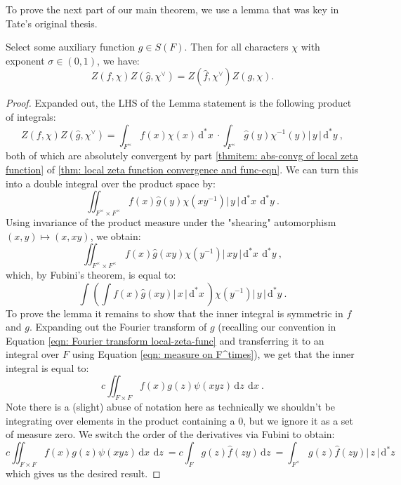 \documentclass[11pt, x11names]{article}
\renewcommand{\brack}[1]{\left(   #1 \right)}
\newcommand{\abs}[1]{\left| \, #1  \,\right|}
\renewcommand{\hat}{\widehat}
\newcommand{\inv}[1]{#1^{-1}}
\newcommand{\dx}{\, \mathrm{d}x \ }
\newcommand{\dz}{\, \mathrm{d}z \ }
\renewcommand{\d}[1]{\, \mathrm{d}#1 \ }
\begin{document}
To prove the next part of our main theorem, we use a lemma that was key in Tate's original thesis. 
\begin{lemma}
\label{lemma: local-zeta-func func eqn}
    Select some auxiliary function $g \in S(F)$. Then for all characters $\chi$ with exponent $\sigma \in (0, 1)$, we have:
    \begin{equation*}
        Z(f, \chi) Z(\hat{g}, \chi^\lor) = Z(\hat{f}, \chi^\lor)Z(g, \chi).
    \end{equation*}
\end{lemma}
\begin{proof}
Expanded out, the LHS of the Lemma statement is the following product of integrals:
\begin{equation*}
    Z(f, \chi) Z(\hat{g}, \chi^\lor) = \int_{F^\times} f(x) \chi(x) \d{^*x} \cdot \int_{F^\times} \hat{g}(y) \inv{\chi}(y) \abs{y} \d{^*y},
\end{equation*}
both of which are absolutely convergent by part \ref{thmitem: abs-convg of local zeta function} of \ref{thm: local zeta function convergence and func-eqn}. We can turn this into a double integral over the product space by:
\begin{equation*}
    \iint_{F^\times \times F^\times} f(x)\hat{g}(y) \chi(x \inv{y}) \abs{y} \d{^*x} \d{^*y}.
\end{equation*}
Using invariance of the product measure under the "shearing" automorphism $(x, y) \mapsto (x, xy)$, we obtain:
\begin{equation*}
    \iint_{F^\times \times F^\times} f(x)\hat{g}(xy)\chi(\inv{y}) \abs{xy} \d{^*x} \d{^*y},
\end{equation*}
which, by Fubini's theorem, is equal to:
\begin{equation*}
    \int \brack{\int f(x)\hat{g}(xy) \abs{x} \d{^*x}} \chi(\inv{y}) \abs{y} \d{^*y}.
\end{equation*}
To prove the lemma it remains to show that the inner integral is symmetric in $f$ and $g$. Expanding out the Fourier transform of $g$ (recalling our convention in Equation \ref{eqn: Fourier transform local-zeta-func} and transferring it to an integral over $F$ using Equation \ref{eqn: measure on F^times}), we get that the inner integral is equal to:
\begin{equation*}
    c \iint_{F \times F} f(x) g(z) \psi(xyz) \dz \dx.
\end{equation*}
Note there is a (slight) abuse of notation here as technically we shouldn't be integrating over elements in the product containing a 0, but we ignore it as a set of measure zero. We switch the order of the derivatives via Fubini to obtain:
\begin{equation*}
    c \iint_{F \times F} f(x) g(z) \psi(xyz) \dx \dz = c \int_F g(z) \hat{f}(zy) \dz = \int_{F^\times}  g(z) \hat{f}(zy) \abs{z} \d{^*z}
\end{equation*}
which gives us the desired result.
\end{proof}
\end{document}
